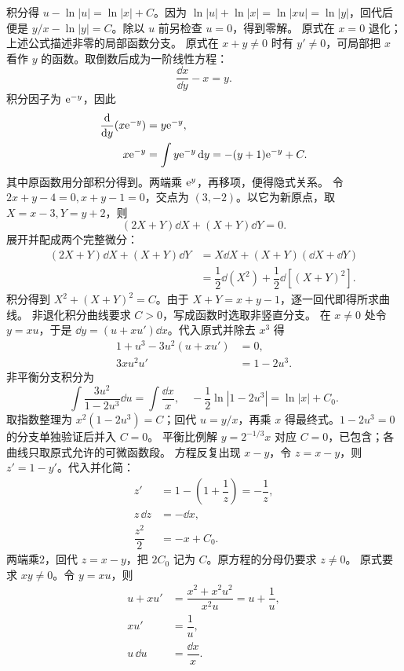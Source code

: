 积分得 $u-\ln|u|=\ln|x|+C$。因为 $\ln|u|+\ln|x|=\ln|xu|=\ln|y|$，回代后便是 $y/x-\ln|y|=C$。除以 $u$ 前另检查 $u=0$，得到零解。
原式在 $x=0$ 退化；上述公式描述非零的局部函数分支。
原式在 $x+y\ne0$ 时有 $y'\ne0$，可局部把 $x$ 看作 $y$ 的函数。取倒数后成为一阶线性方程：
\[
\dfrac{\dd x}{\dd y}-x=y.
\]
积分因子为 $\mathrm e^{-y}$，因此
\[
\begin{aligned}
\dfrac{\mathrm d}{\mathrm d y}(x\mathrm e^{-y})&=y\mathrm e^{-y},\\
x\mathrm e^{-y}&=\int y\mathrm e^{-y}\,\mathrm d y
=-(y+1)\mathrm e^{-y}+C.
\end{aligned}
\]
其中原函数用分部积分得到。两端乘 $\mathrm e^y$，再移项，便得隐式关系。
令 $2x+y-4=0,x+y-1=0$，交点为 $(3,-2)$。以它为新原点，取 $X=x-3,Y=y+2$，则
\[
(2X+Y)\dd X+(X+Y)\dd Y=0.
\]
展开并配成两个完整微分：
\[
\begin{aligned}
(2X+Y)\dd X+(X+Y)\dd Y
 &=X\dd X+(X+Y)(\dd X+\dd Y)\\
 &=\dfrac12\dd(X^2)+\dfrac12\dd[(X+Y)^2].
\end{aligned}
\]
积分得到 $X^2+(X+Y)^2=C$。由于 $X+Y=x+y-1$，逐一回代即得所求曲线。
非退化积分曲线要求 $C>0$，写成函数时选取非竖直分支。
在 $x\ne0$ 处令 $y=xu$，于是 $\dd y=(u+xu')\dd x$。代入原式并除去 $x^3$ 得
\[
\begin{aligned}
1+u^3-3u^2(u+xu')&=0,\\
3xu^2u'&=1-2u^3.
\end{aligned}
\]
非平衡分支积分为
\[
\int\dfrac{3u^2}{1-2u^3}\dd u=\int\dfrac{\dd x}x,
\quad -\dfrac12\ln|1-2u^3|=\ln|x|+C_0.
\]
取指数整理为 $x^2(1-2u^3)=C$；回代 $u=y/x$，再乘 $x$ 得最终式。$1-2u^3=0$ 的分支单独验证后并入 $C=0$。
平衡比例解 $y=2^{-1/3}x$ 对应 $C=0$，已包含；各曲线只取原式允许的可微函数段。
方程反复出现 $x-y$，令 $z=x-y$，则 $z'=1-y'$。代入并化简：
\[
\begin{aligned}
z'&=1-\left(1+\dfrac1z\right)=-\dfrac1z,\\
z\,\dd z&=-\dd x,\\
\dfrac{z^2}{2}&=-x+C_0.
\end{aligned}
\]
两端乘2，回代 $z=x-y$，把 $2C_0$ 记为 $C$。原方程的分母仍要求 $z\ne0$。
原式要求 $xy\ne0$。令 $y=xu$，则
\[
\begin{aligned}
u+xu'&=\dfrac{x^2+x^2u^2}{x^2u}=u+\dfrac1u,\\
xu'&=\dfrac1u,\\
u\,\dd u&=\dfrac{\dd x}x.
\end{aligned}
\]
